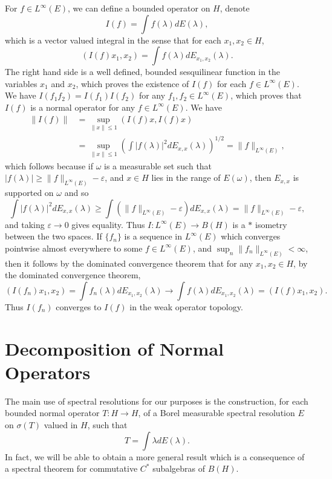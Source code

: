 For $f \in L^\infty(E)$, we can define a bounded operator on $H$, denote
%
\[ I(f) = \int f(\lambda) dE(\lambda), \]
%
which is a vector valued integral in the sense that for each $x_1,x_2 \in H$,
%
\[ \left( I(f) x_1, x_2 \right) = \int f(\lambda) dE_{x_1,x_2}(\lambda). \]
%
The right hand side is a well defined, bounded sesquilinear function in the variables $x_1$ and $x_2$, which proves the existence of $I(f)$ for each $f \in L^\infty(E)$. We have $I(f_1 f_2) = I(f_1) I(f_2)$ for any $f_1, f_2 \in L^\infty(E)$, which proves that $I(f)$ is a normal operator for any $f \in L^\infty(E)$. We have
%
\begin{align*}
    \| I(f) \| &= \sup_{\| x \| \leq 1} (I(f) x, I(f) x)\\
    &= \sup_{\| x \| \leq 1} \left( \int |f(\lambda)|^2 dE_{x,x}(\lambda) \right)^{1/2} = \| f \|_{L^\infty(E)},
\end{align*}
%
which follows because if $\omega$ is a measurable set such that $|f(\lambda)| \geq \| f \|_{L^\infty(E)} - \varepsilon$, and $x \in H$ lies in the range of $E(\omega)$, then $E_{x,x}$ is supported on $\omega$ and so
%
\[ \int |f(\lambda)|^2 dE_{x,x}(\lambda) \geq \int \left( \| f \|_{L^\infty(E)} - \varepsilon \right) dE_{x,x}(\lambda) = \| f \|_{L^\infty(E)} - \varepsilon, \]
%
and taking $\varepsilon \to 0$ gives equality. Thus $I: L^\infty(E) \to B(H)$ is a $*$ isometry between the two spaces. If $\{ f_n \}$ is a sequence in $L^\infty(E)$ which converges pointwise almost everywhere to some $f \in L^\infty(E)$, and $\sup_n \| f_n \|_{L^\infty(E)} < \infty$, then it follows by the dominated convergence theorem that for any $x_1,x_2 \in H$, by the dominated convergence theorem,
%
\[ ( I(f_n) x_1, x_2 ) = \int f_n(\lambda) dE_{x_1,x_2}(\lambda) \to \int f(\lambda) dE_{x_1,x_2}(\lambda) = (I(f) x_1,x_2). \]
%
Thus $I(f_n)$ converges to $I(f)$ in the weak operator topology.

\section{Decomposition of Normal Operators}

The main use of spectral resolutions for our purposes is the construction, for each bounded normal operator $T: H \to H$, of a Borel measurable spectral resolution $E$ on $\sigma(T)$ valued in $H$, such that
%
\[ T = \int \lambda dE(\lambda). \]
%
In fact, we will be able to obtain a more general result which is a consequence of a spectral theorem for commutative $C^*$ subalgebras of $B(H)$.

